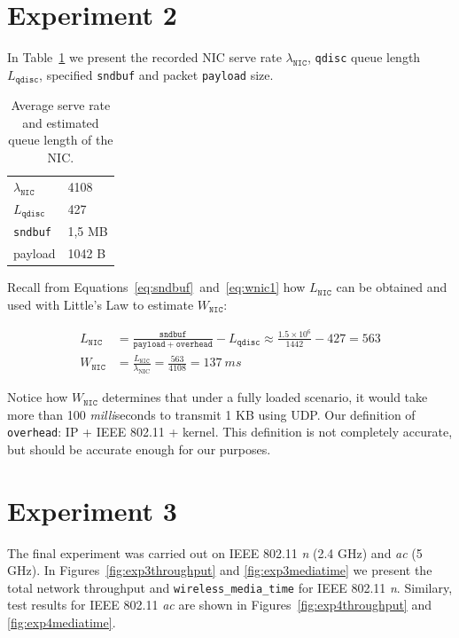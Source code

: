 \section{Experiment 2}

In Table~\ref{tab:exp2data} we present the recorded NIC serve rate
$\lambda_{\mathtt{NIC}}$, \texttt{qdisc} queue length $L_{\mathtt{qdisc}}$,
specified \texttt{sndbuf} and packet \texttt{payload} size.

\begin{table}[tbp]
  \centering
  \begin{tabular}{ll}
    $\lambda_{\mathtt{NIC}}$ & 4108 \\
    $L_\mathtt{qdisc}$ & 427 \\
    \texttt{sndbuf} & 1,5 MB \\
    payload & 1042 B
  \end{tabular}
  \caption{Average serve rate and estimated queue length of the NIC.}
  \label{tab:exp2data}
\end{table}

Recall from Equations~\ref{eq:sndbuf}~and~\ref{eq:wnic1} how
$L_{\mathtt{NIC}}$ can be obtained and used with Little's Law to estimate
$W_{\mathtt{NIC}}$:

\begin{align*}
L_{\mathtt{NIC}} &= \frac{\mathtt{sndbuf}}{\mathtt{payload} + \mathtt{overhead}} - L_\mathtt{qdisc} \approx \frac{1.5 \times 10^6}{1442} - 427 = 563 \\
W_\mathtt{NIC} &= \frac{L_{\mathtt{NIC}}}{\lambda_\text{NIC}} = \frac{563}{4108} = 137~ms
\end{align*}

Notice how $W_\mathtt{NIC}$ determines that under a fully loaded scenario, it
would take more than 100 \emph{milli}seconds to transmit 1 KB using UDP. Our
definition of \texttt{overhead}: IP + IEEE 802.11 + kernel. This definition is
not completely accurate, but should be accurate enough for our purposes.

\section{Experiment 3}

The final experiment was carried out on IEEE 802.11 \emph{n} (2.4 GHz) and
\emph{ac} (5 GHz). In Figures~\ref{fig:exp3throughput} and
\ref{fig:exp3mediatime} we present the total network throughput and
\texttt{wireless\_media\_time} for IEEE 802.11 \emph{n}. Similary, test
results for IEEE 802.11 \emph{ac} are shown in
Figures~\ref{fig:exp4throughput} and \ref{fig:exp4mediatime}.

